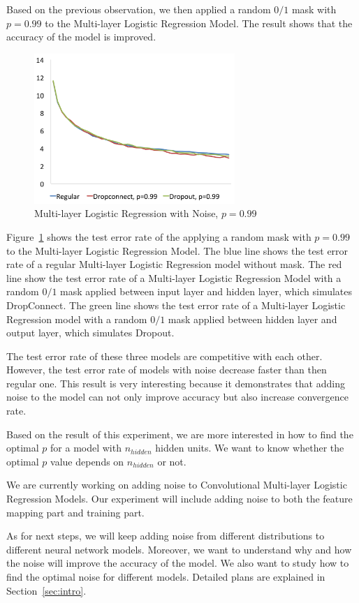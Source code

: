 Based on the previous observation, we then applied a random $0/1$ mask
with $p=0.99$ to the Multi-layer Logistic Regression Model. The result
shows that the accuracy of the model is improved.

\begin{figure}[h]
\centering
\includegraphics[width=215pt]{figs/mlp_pbig.png}
\caption{Multi-layer Logistic Regression with Noise, $p=0.99$}
\label{fig:mlp-noise-pbig}
\end{figure}

Figure~\ref{fig:mlp-noise-pbig} shows the test error rate of the
applying a random mask with $p=0.99$ to the Multi-layer Logistic
Regression Model.
The blue line shows the test error rate of a regular Multi-layer Logistic
Regression model without mask.
The red line show the test error rate of a Multi-layer Logistic Regression
Model with a random $0/1$ mask applied between input layer and hidden
layer, which simulates DropConnect.
The green line shows the test error rate of a Multi-layer Logistic
Regression model with a random $0/1$ mask applied between hidden layer and
output layer, which simulates Dropout.

The test error rate of these three models are competitive with each other.
However, the test error rate of models with noise decrease faster than
then regular one. This result is very interesting because it demonstrates
that adding noise to the model can not only improve accuracy but also
increase convergence rate.

Based on the result of this experiment, we are more interested in how to
find the optimal $p$ for a model with $n_{hidden}$ hidden units. We want to
know whether the optimal $p$ value depends on $n_{hidden}$ or not.

We are currently working on adding noise to Convolutional Multi-layer
Logistic Regression Models. Our experiment will include adding noise to
both the feature mapping part and training part.

As for next steps, we will keep adding noise from different
distributions to different neural network models.
Moreover, we want to understand why and how the noise will improve the
accuracy of the model. We also want to study how to find the optimal
noise for different models. Detailed plans are explained in
Section~\ref{sec:intro}.

